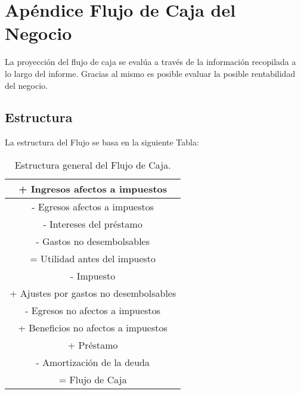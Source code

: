 \section{Apéndice Flujo de Caja del Negocio}
La proyección del flujo de caja se evalúa a través de la información recopilada a lo largo del informe. Gracias al mismo es posible evaluar la posible rentabilidad del negocio.

\subsection{Estructura}
La estructura del Flujo se basa en la siguiente Tabla:

\begin{table}[H]
  \centering
    \begin{tabular}{|c|}
    \hline
    \textcolor[rgb]{ 0,  .69,  .314}{+ Ingresos afectos a impuestos} \bigstrut\\
    \hline
    \textcolor[rgb]{ 1,  0,  0}{- Egresos afectos a impuestos} \bigstrut\\
    \hline
    \textcolor[rgb]{ 1,  0,  0}{- Intereses del préstamo} \bigstrut\\
    \hline
    \textcolor[rgb]{ 1,  0,  0}{- Gastos no desembolsables} \bigstrut\\
    \hline
    \textcolor[rgb]{ 0,  .439,  .753}{= Utilidad antes del impuesto} \bigstrut\\
    \hline
    \textcolor[rgb]{ 1,  0,  0}{- Impuesto} \bigstrut\\
    \hline
    \textcolor[rgb]{ 0,  .69,  .314}{+ Ajustes por gastos no desembolsables} \bigstrut\\
    \hline
    \textcolor[rgb]{ 1,  0,  0}{- Egresos no afectos a impuestos} \bigstrut\\
    \hline
    \textcolor[rgb]{ 0,  .69,  .314}{+ Beneficios no afectos a impuestos} \bigstrut\\
    \hline
    \textcolor[rgb]{ 0,  .69,  .314}{+ Préstamo} \bigstrut\\
    \hline
    \textcolor[rgb]{ 1,  0,  0}{- Amortización de la deuda} \bigstrut\\
    \hline
    \textcolor[rgb]{ 0,  .439,  .753}{= Flujo de Caja} \bigstrut\\
    \hline
    \end{tabular}%
      \caption{Estructura general del Flujo de Caja.}
  \label{tab:estructura}%
\end{table}%

